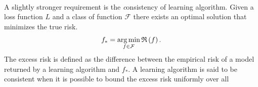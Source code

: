 \paragraph{}
A slightly stronger requirement is the {\emph consistency} of learning algorithm.
Given a loss function $L$ and a class of function $\mathcal{F}$ there exists an
optimal solution that minimizes the true risk.
\begin{dmath*}
    f_* = \argmin_{f\in\mathcal{F}} \risk{f}.
\end{dmath*}
The excess risk is defined as the difference between the empirical risk of a
model returned by a learning algorithm and $f_*$. A learning algorithm is said
to be consistent when it is possible to bound the excess risk uniformly over
all

